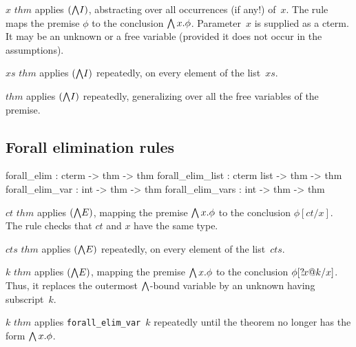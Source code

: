 \begin{ttdescription}
\item[\ttindexbold{forall_intr} $x$ $thm$] 
applies $({\bigwedge}I)$, abstracting over all occurrences (if any!) of~$x$.
The rule maps the premise $\phi$ to the conclusion $\bigwedge x.\phi$.
Parameter~$x$ is supplied as a cterm.  It may be an unknown or a free
variable (provided it does not occur in the assumptions).

\item[\ttindexbold{forall_intr_list} $xs$ $thm$] 
applies $({\bigwedge}I)$ repeatedly, on every element of the list~$xs$.

\item[\ttindexbold{forall_intr_frees} $thm$] 
applies $({\bigwedge}I)$ repeatedly, generalizing over all the free variables
of the premise.
\end{ttdescription}


\subsection{Forall elimination rules}
\begin{ttbox} 
forall_elim       : cterm      -> thm -> thm
forall_elim_list  : cterm list -> thm -> thm
forall_elim_var   :        int -> thm -> thm
forall_elim_vars  :        int -> thm -> thm
\end{ttbox}

\begin{ttdescription}
\item[\ttindexbold{forall_elim} $ct$ $thm$] 
applies $({\bigwedge}E)$, mapping the premise $\bigwedge x.\phi$ to the conclusion
$\phi[ct/x]$.  The rule checks that $ct$ and $x$ have the same type.

\item[\ttindexbold{forall_elim_list} $cts$ $thm$] 
applies $({\bigwedge}E)$ repeatedly, on every element of the list~$cts$.

\item[\ttindexbold{forall_elim_var} $k$ $thm$] 
applies $({\bigwedge}E)$, mapping the premise $\bigwedge x.\phi$ to the conclusion
$\phi[{?\!x@k}/x]$.  Thus, it replaces the outermost $\bigwedge$-bound
variable by an unknown having subscript~$k$.

\item[\ttindexbold{forall_elim_vars} $k$ $thm$] 
applies {\tt forall_elim_var}~$k$ repeatedly until the theorem no longer has
the form $\bigwedge x.\phi$.
\end{ttdescription}


